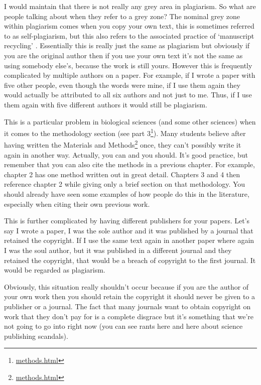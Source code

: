 \documentclass[
]{krantz}
\renewcommand{\href}[2]{#2\footnote{\url{#1}}}
\begin{document}
I would maintain that there is not really any grey area in plagiarism. So what are people talking about when they refer to a grey zone? The nominal grey zone within plagiarism comes when you copy your own text, this is sometimes referred to as self-plagiarism, but this also refers to the associated practice of `manuscript recycling' \citep{geraldi2021self-plagiarism}. Essentially this is really just the same as plagiarism but obviously if you are the original author then if you use your own text it's not the same as using somebody else's, because the work is still yours. However this is frequently complicated by multiple authors on a paper. For example, if I wrote a paper with five other people, even though the words were mine, if I use them again they would actually be attributed to all six authors and not just to me. Thus, if I use them again with five different authors it would still be plagiarism.

This is a particular problem in biological sciences (and some other sciences) when it comes to the methodology section (\href{methods.html}{see part 3}). Many students believe after having written the \href{methods.html}{Materials and Methods} once, they can't possibly write it again in another way. Actually, you can and you should. It's good practice, but remember that you can also cite the methods in a previous chapter. For example, chapter 2 has one method written out in great detail. Chapters 3 and 4 then reference chapter 2 while giving only a brief section on that methodology. You should already have seen some examples of how people do this in the literature, especially when citing their own previous work.

This is further complicated by having different publishers for your papers. Let's say I wrote a paper, I was the sole author and it was published by a journal that retained the copyright. If I use the same text again in another paper where again I was the soul author, but it was published in a different journal and they retained the copyright, that would be a breach of copyright to the first journal. It would be regarded as plagiarism.

Obviously, this situation really shouldn't occur because if you are the author of your own work then you should retain the copyright it should never be given to a publisher or a journal. The fact that many journals want to obtain copyright on work that they don't pay for is a complete disgrace but it's something that we're not going to go into right now (you can see rants here and here about science publishing scandals).
\end{document}
